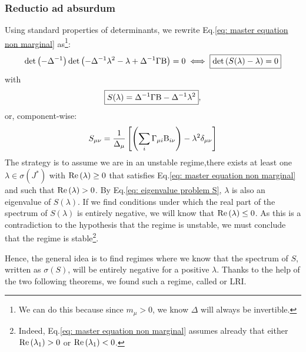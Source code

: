 \documentclass[12pt, titlepage]{report}
\begin{document}
\subsubsection{Reductio ad absurdum} \label{subsubsec: reductio ad absurdum}
Using standard properties of determinants, we rewrite Eq.\eqref{eq: master equation non marginal} as\footnote{We can do this because since $m_\mu > 0$, we know $\Delta$ will always be invertible.}:
\begin{equation}
\det\left(-\Delta^{-1}\right)\det\left(-\Delta^{-1}\lambda^2-\lambda+\Delta^{-1}\Gamma\text{B}\right)=0\iff \boxed{\det\left(S(\lambda)-\lambda\right)=0} \label{eq: eigenvalue problem S}
\end{equation}
with
\begin{equation}
\boxed{S(\lambda)=\Delta^{-1}\Gamma\text{B}-\Delta^{-1}\lambda^2}, \label{eq: equation stability S}
\end{equation}
or, component-wise:
\begin{equation}
S_{\mu \nu} = \frac{1}{\Delta_\mu}\left[\left(\sum_i \Gamma_{\mu i}\text{B}_{i \nu}\right) - \lambda^2 \delta_{\mu\nu}\right] \label{eq: definition S component wise}
\end{equation}
The strategy is to assume we are in an unstable regime,\ie there exists at least one $\lambda \in \sigma(J^*)$ with $\text{Re}\left(\lambda\right)\geq 0$ that satisfies Eq.\eqref{eq: master equation non marginal} and such that $\text{Re}\left(\lambda\right) > 0$. By Eq.\eqref{eq: eigenvalue problem S}, $\lambda$ is also an eigenvalue of $S(\lambda)$. If we find conditions under which the real part of the spectrum of $S(\lambda)$ is entirely negative, we will know that $\text{Re}\left(\lambda\right) \leq 0$. As this is a contradiction to the hypothesis that the regime is unstable, we must conclude that the regime is stable\footnote{Indeed, Eq.\eqref{eq: master equation non marginal} assumes already that either $\text{Re}\left(\lambda_1\right) >0$ or $\text{Re}\left(\lambda_1\right) < 0$.}.

Hence, the general idea is to find regimes where we know that the spectrum of $S$, written as $\sigma(S)$, will be entirely negative for a positive $\lambda$. Thanks to the help of the two following theorems, we found such a regime, called  or LRI.
\end{document}
